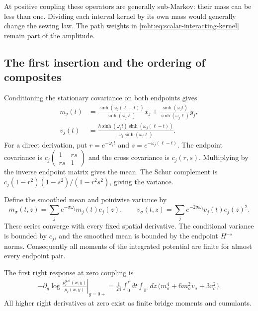 At positive coupling these operators are generally sub-Markov:
their mass can be less than one. Dividing each interval kernel
by its own mass would generally change the sewing law.
The path weights in \eqref{mht:eq:scalar-interacting-kernel}
remain part of the amplitude.

\subsection{The first insertion and the ordering of composites}

Conditioning the stationary covariance on both endpoints gives
\begin{align}
 m_j(t)&=\frac{\sinh(\omega_j(\ell-t))}{\sinh(\omega_j\ell)}x_j
           +\frac{\sinh(\omega_jt)}{\sinh(\omega_j\ell)}y_j,
       \label{mht:eq:scalar-bridge-mean}\\
 v_j(t)&=\frac{\hbar\sinh(\omega_jt)
                            \sinh(\omega_j(\ell-t))}
                            {\omega_j\sinh(\omega_j\ell)}.
       \label{mht:eq:scalar-bridge-variance}
\end{align}
For a direct derivation, put $r=e^{-\omega_jt}$ and
$s=e^{-\omega_j(\ell-t)}$. The endpoint covariance is
$c_j\left(\begin{smallmatrix}1&rs\\rs&1\end{smallmatrix}\right)$
and the cross covariance is $c_j(r,s)$.
Multiplying by the inverse endpoint matrix gives the mean.
The Schur complement is
$c_j(1-r^2)(1-s^2)/(1-r^2s^2)$, giving the variance.

Define the smoothed mean and pointwise variance by
\[
 m_\sigma(t,z)=\sum_je^{-\sigma\omega_j}m_j(t)e_j(z),
 \qquad
 v_\sigma(t,z)=\sum_je^{-2\sigma\omega_j}v_j(t)e_j(z)^2.
\]
These series converge with every fixed spatial derivative.
The conditional variance is bounded by $c_j$, and the
smoothed mean is bounded by the endpoint $H^{-s}$ norms.
Consequently all moments of the integrated potential are
finite for almost every endpoint pair.

\begin{proposition}\label{mht:prop:scalar-first-insertion}
The first right response at zero coupling is
\begin{align}
 -\left.\partial_g\log
       \frac{p_\ell^{g,\sigma}(x,y)}{p_\ell(x,y)}\right|_{g=0+}
  =\frac1{24}\int_0^\ell dt\int_{\mathbb T^5}dz\,
       \bigl(m_\sigma^4+6m_\sigma^2v_\sigma+3v_\sigma^2\bigr).
       \label{mht:eq:scalar-first-insertion}
\end{align}
All higher right derivatives at zero exist as finite bridge
moments and cumulants.
\end{proposition}

